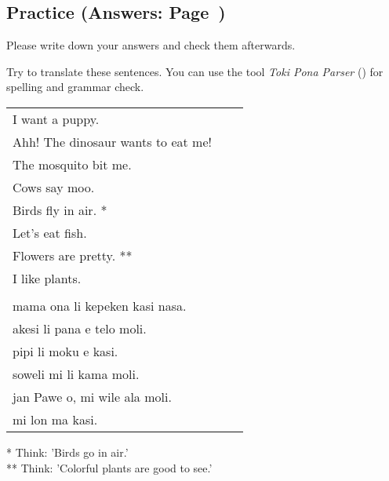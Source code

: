 \subsection*{Practice (Answers: Page~\pageref{'living_things'})}
%
Please write down your answers and check them afterwards. 

Try to translate these sentences. 
You can use the tool \textit{Toki Pona Parser} (\cite{www:rowa:02}) for spelling and grammar check. 

\begin{supertabular}{p{5,5cm}|ll}
I want a puppy. &&   \\ %
Ahh! The dinosaur wants to eat me!  &&  \\ %
The mosquito bit me.  &&  \\ %
Cows say moo.  &&  \\ %
Birds fly in air. * &&  \\ %
Let's eat fish.  &&  \\ %
Flowers are pretty. ** &&  \\ %
I like plants. &&   \\ %
 && \\ %
mama ona li kepeken kasi nasa.  &&  \\ %
akesi li pana e telo moli. &&  \\  %
pipi li moku e kasi.  &&  \\ %
soweli mi li kama moli.  &&  \\ %
jan Pawe o, mi wile ala moli. && \\   %
mi lon ma kasi. &&   \\ %
\end{supertabular} 

* Think: 'Birds go in air.' \\
** Think: 'Colorful plants are good to see.' 
